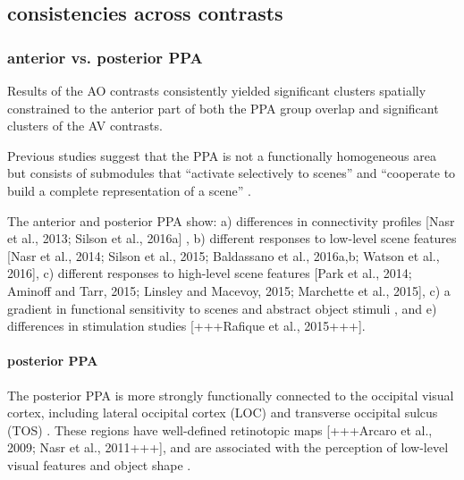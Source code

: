 \documentclass[english]{article}
\begin{document}
\subsection{consistencies across contrasts}


\subsubsection{anterior vs. posterior PPA}

Results of the AO contrasts consistently yielded significant clusters spatially
constrained to the anterior part of both the PPA group overlap and significant
clusters of the AV contrasts.

Previous studies suggest that the PPA is not a functionally homogeneous area but
consists of submodules that ``activate selectively to scenes'' and ``cooperate
to build a complete representation of a scene''
\citep{baldassano2013differential}.

%
The anterior and posterior PPA show:
a) differences in connectivity profiles [Nasr et al., 2013; Silson et al.,
2016a] \citep{baldassano2013differential, baldassano2016two},
b) different responses to low-level scene features [Nasr et al., 2014; Silson et
al., 2015; Baldassano et al., 2016a,b; Watson et al.,
2016]\citep{baldassano2016two},
c) different responses to high-level scene features [Park et al., 2014; Aminoff
and Tarr, 2015; Linsley and Macevoy, 2015; Marchette et al.,
2015]\citep{baldassano2016two},
c) a gradient in functional sensitivity to scenes and abstract object stimuli
\citep{arcaro2009retinotopic, aminoff2007parahippocampal,
baldassano2013differential}, and
e) differences in stimulation studies [+++Rafique et al.,
2015+++]\citep{baldassano2016two}.  \paragraph{posterior PPA}

The posterior PPA is more strongly functionally connected to the occipital
visual cortex, including lateral occipital cortex (LOC) and transverse occipital
sulcus (TOS) \citep{baldassano2013differential, baldassano2016two}.
These regions have well-defined retinotopic maps [+++Arcaro et al., 2009; Nasr
et al., 2011+++], and are associated with the perception of low-level visual
features and object shape \citep{baldassano2013differential}.
\end{document}
